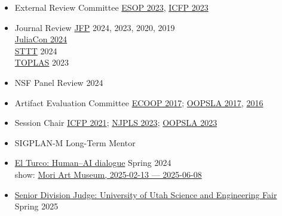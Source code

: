 \documentclass[11pt]{article}
\begin{document}
\begin{itemize}
  \item {External Review Committee} \hfill \href{https://etaps.org/2023/esop}{ESOP 2023},
                                           \href{https://icfp23.sigplan.org/}{ICFP 2023}
  \item {Journal Review}
           \hfill \href{https://www.cambridge.org/core/journals/journal-of-functional-programming}{JFP} 2024, 2023, 2020, 2019 \\ %
    \hbox{}\hfill \href{https://juliacon.org/2024/}{JuliaCon 2024} \\
    \hbox{}\hfill \href{https://link.springer.com/journal/10009}{STTT} 2024 \\
    \hbox{}\hfill \href{https://dl.acm.org/journal/toplas}{TOPLAS} 2023 %
  \item {NSF Panel Review} \hfill {2024}
  \item {Artifact Evaluation Committee} \hfill \href{https://2017.ecoop.org/track/ecoop-2017-Artifacts}{ECOOP 2017};
                                               \href{https://2017.splashcon.org/track/splash-2017-OOPSLA-Artifacts}{OOPSLA 2017},
                                               \href{http://2016.splashcon.org/track/splash-2016-artifacts}{2016}
  \item {Session Chair} \hfill \href{https://icfp21.sigplan.org/program/program-icfp-2021/}{ICFP 2021};
                               \href{https://www.njpls.org/nov2023.html}{NJPLS 2023};
                               \href{https://2023.splashcon.org/program/program-splash-2023/?date=Wed%2025%20Oct%202023&room=Room%20II}{OOPSLA 2023}
                             \item {SIGPLAN-M Long-Term Mentor} \hfill {}
  \item \href{https://elturco.diemutstrebe.com}{El Turco: Human--AI dialogue} \hfill Spring 2024 \\
    show: \href{https://www.shift.jp.org/en/archives/2025/02/machine-love-video-game-ai-and-contemporary-art.html/3/}{Mori Art Museum, 2025-02-13 --- 2025-06-08}
  \item \href{https://usef.utah.edu/fair-details}{Senior Division Judge: University of Utah Science and Engineering Fair} \hfill Spring 2025

\end{itemize}
\end{document}
